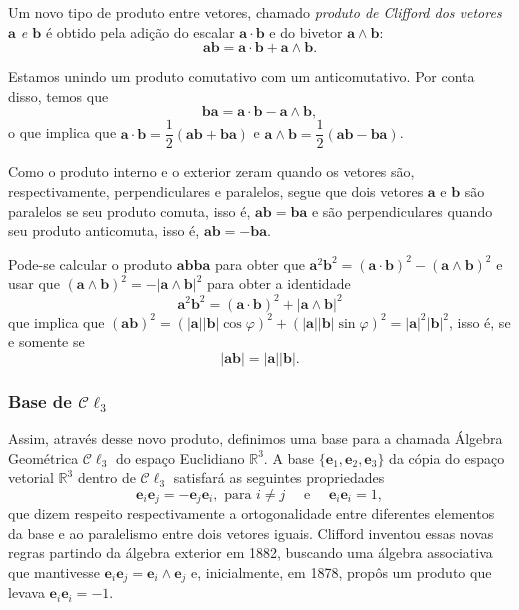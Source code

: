 \documentclass[a4paper,12pt]{report}
\theoremstyle{plain}
\theoremstyle{definition}
\newcommand{\norm}[1]{\left| #1 \right|}
\begin{document}
	Um novo tipo de produto entre vetores, chamado \emph{produto de Clifford dos vetores $\mathbf a$ e $\mathbf b$} é obtido pela adição do escalar $\mathbf a\cdot \mathbf b$ e do bivetor $\mathbf a\wedge\mathbf b$: $$\mathbf a\mathbf b = \mathbf a\cdot \mathbf b + \mathbf a\wedge \mathbf b.$$
	
	Estamos unindo um produto comutativo com um anticomutativo. Por conta disso, temos que $$\mathbf b\mathbf a = \mathbf a\cdot \mathbf b - \mathbf a\wedge\mathbf b,$$
	o que implica que $\mathbf a\cdot \mathbf b = \dfrac 1 2 (\mathbf a\mathbf b + \mathbf b\mathbf a)$ e $\mathbf a\wedge \mathbf b = \dfrac 1 2 (\mathbf a\mathbf b - \mathbf b\mathbf a)$.
	
	Como o produto interno e o exterior zeram quando os vetores são, respectivamente, perpendiculares e paralelos, segue que dois vetores $\mathbf a$ e $\mathbf b$ são paralelos se seu produto comuta, isso é, $\mathbf a \mathbf b = \mathbf b \mathbf a$ e são perpendiculares quando seu produto anticomuta, isso é, $\mathbf a\mathbf b = -\mathbf b\mathbf a$.
	
	Pode-se calcular o produto $\mathbf a\mathbf b\mathbf b\mathbf a$ para obter que $\mathbf a^2\mathbf b^2 = (\mathbf a\cdot \mathbf b)^2 - (\mathbf a\wedge \mathbf b)^2$ e usar que $(\mathbf a\wedge\mathbf b)^2 = -\norm{\mathbf a\wedge\mathbf b}^2$ para obter a identidade
	$$\mathbf a^2\mathbf b^2 = (\mathbf a\cdot\mathbf b)^2 + \norm{\mathbf a\wedge\mathbf b}^2$$
	que implica que $(\mathbf a\mathbf b)^2 = (\norm{\mathbf a}\norm{\mathbf b}\cos\varphi)^2 + (\norm{\mathbf a}\norm{\mathbf b}\sin\varphi)^2 = \norm{\mathbf a}^2\norm{\mathbf b}^2$, isso é, se e somente se $$\norm{\mathbf a\mathbf b} = \norm{\mathbf a}\norm{\mathbf b}.$$
	
	\subsubsection{Base de $\mathcal C \ell_3$}
	
	Assim, através desse novo produto, definimos uma base para a chamada Álgebra Geométrica $\mathcal C \ell_3$ do espaço Euclidiano $\mathbb{R}^3$. A base $\{\mathbf e_1,\mathbf e_2,\mathbf e_3\}$ da cópia do espaço vetorial $\mathbb{R}^3$ dentro de $\mathcal C \ell_3$ satisfará as seguintes propriedades
	$$\mathbf e_i\mathbf e_j = -\mathbf e_j\mathbf e_i, \text{ para } i\neq j\quad\text{ e }\quad \mathbf e_i\mathbf e_i = 1,$$
	que dizem respeito respectivamente a ortogonalidade entre diferentes elementos da base e ao paralelismo entre dois vetores iguais. Clifford inventou essas novas regras partindo da álgebra exterior em 1882, buscando uma álgebra associativa que mantivesse $\mathbf e_i\mathbf e_j = \mathbf e_i\wedge\mathbf e_j$ e, inicialmente, em 1878, propôs um produto que levava $\mathbf e_i\mathbf e_i = -1$.
	
\end{document}
